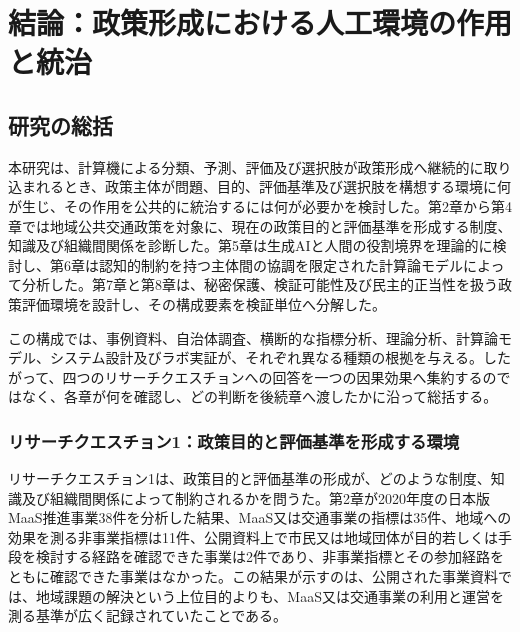 
\chapter{結論：政策形成における人工環境の作用と統治}
\label{chap:conclusion}

\section{研究の総括}
\label{sec:ch10_summary}

本研究は、計算機による分類、予測、評価及び選択肢が政策形成へ継続的に取り込まれるとき、政策主体が問題、目的、評価基準及び選択肢を構想する環境に何が生じ、その作用を公共的に統治するには何が必要かを検討した。第2章から第4章では地域公共交通政策を対象に、現在の政策目的と評価基準を形成する制度、知識及び組織間関係を診断した。第5章は生成AIと人間の役割境界を理論的に検討し、第6章は認知的制約を持つ主体間の協調を限定された計算論モデルによって分析した。第7章と第8章は、秘密保護、検証可能性及び民主的正当性を扱う政策評価環境を設計し、その構成要素を検証単位へ分解した。

この構成では、事例資料、自治体調査、横断的な指標分析、理論分析、計算論モデル、システム設計及びラボ実証が、それぞれ異なる種類の根拠を与える。したがって、四つのリサーチクエスチョンへの回答を一つの因果効果へ集約するのではなく、各章が何を確認し、どの判断を後続章へ渡したかに沿って総括する。

\subsection{リサーチクエスチョン1：政策目的と評価基準を形成する環境}

リサーチクエスチョン1は、政策目的と評価基準の形成が、どのような制度、知識及び組織間関係によって制約されるかを問うた。第2章が2020年度の日本版MaaS推進事業38件を分析した結果、MaaS又は交通事業の指標は35件、地域への効果を測る非事業指標は11件、公開資料上で市民又は地域団体が目的若しくは手段を検討する経路を確認できた事業は2件であり、非事業指標とその参加経路をともに確認できた事業はなかった。この結果が示すのは、公開された事業資料では、地域課題の解決という上位目的よりも、MaaS又は交通事業の利用と運営を測る基準が広く記録されていたことである。


